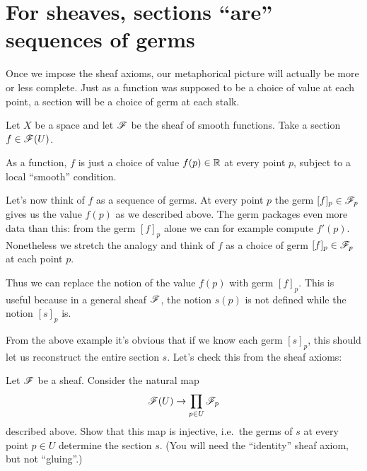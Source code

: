 \section{For sheaves, sections ``are'' sequences of germs}

Once we impose the sheaf axioms,
our metaphorical picture will actually be more or less complete.
Just as a function was supposed to be a choice of value at each point,
a section will be a choice of germ at each stalk.

\begin{example}
	Let $X$ be a space and let $\mathscr F$ be the sheaf of smooth functions.
	Take a section $f \in \mathscr F(U)$.
	\begin{itemize}
		\ii As a function, $f$ is just a choice of value $f(p) \in \mathbb R$ at
		every point $p$, subject to a local ``smooth'' condition.

		\ii Let's now think of $f$ as a sequence of germs.
		At every point $p$ the germ $[f]_p \in \mathscr F_p$ gives us the value $f(p)$
		as we described above. The germ packages even more data than this:
		from the germ $[f]_p$ alone we can for example compute $f'(p)$.
		Nonetheless we stretch the analogy and think of $f$
		as a choice of germ $[f]_p \in \mathscr F_p$ at each point $p$.
	\end{itemize}
	Thus we can replace the notion of the value $f(p)$ with germ $[f]_p$.
	This is useful because in a general sheaf $\mathscr F$, the notion $s(p)$
	is not defined while the notion $[s]_p$ is.
\end{example}


From the above example it's obvious that if we know each germ $[s]_p$,
this should let us reconstruct the entire section $s$.
Let's check this from the sheaf axioms:
\begin{exercise}
	Let $\mathscr F$ be a sheaf.
	Consider the natural map
	\[ \mathscr F(U) \to \prod_{p \in U} \mathscr F_p \]
	described above.
	Show that this map is injective, i.e.\
	the germs of $s$ at every point $p \in U$ determine the section $s$.
	(You will need the ``identity'' sheaf axiom, but not ``gluing''.)
\end{exercise}

